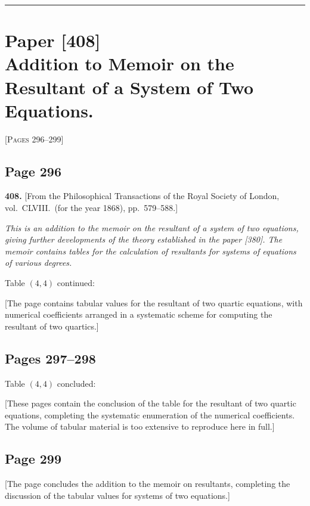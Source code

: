 \documentclass[11pt,a4paper]{article}
\theoremstyle{definition}
\begin{document}
\vspace{12pt}
\noindent\rule{\textwidth}{0.4pt}
\vspace{12pt}

\section*{Paper [408]\\
\textnormal{Addition to Memoir on the Resultant of a System of Two Equations.}}

\vspace{6pt}
\noindent\textsc{[Pages 296--299]}
\vspace{6pt}

\subsection*{Page 296}

\noindent\textbf{408.} [From the Philosophical Transactions of the Royal Society of London, vol.~CLVIII.\ (for the year 1868), pp.~579--588.]

\medskip
\noindent\textit{This is an addition to the memoir on the resultant of a system of two equations, giving further developments of the theory established in the paper [380]. The memoir contains tables for the calculation of resultants for systems of equations of various degrees.}

\medskip
\noindent Table $(4, 4)$ continued:

[The page contains tabular values for the resultant of two quartic equations, with numerical coefficients arranged in a systematic scheme for computing the resultant of two quartics.]

\subsection*{Pages 297--298}

Table $(4, 4)$ concluded:

[These pages contain the conclusion of the table for the resultant of two quartic equations, completing the systematic enumeration of the numerical coefficients. The volume of tabular material is too extensive to reproduce here in full.]

\subsection*{Page 299}

[The page concludes the addition to the memoir on resultants, completing the discussion of the tabular values for systems of two equations.]
\end{document}
